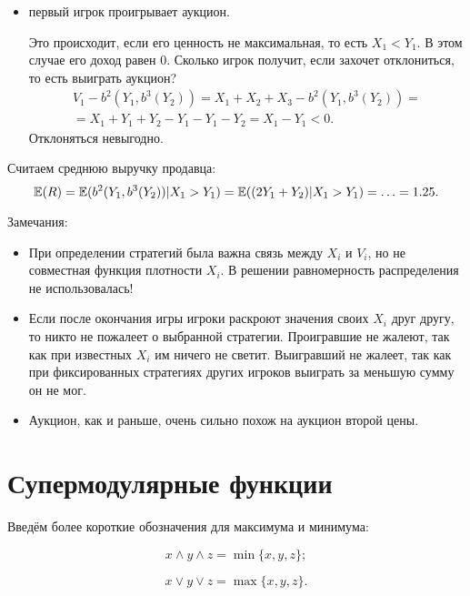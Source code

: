 \begin{myex}
\begin{itemize}
\item первый игрок проигрывает аукцион.

Это происходит, если его ценность не максимальная, то есть $ X_{1}<Y_{1} $. В этом случае его доход равен 0. Сколько игрок получит, если захочет отклониться, то есть выиграть аукцион?
\begin{multline}
 V_{1}-b^{2}(Y_{1},b^{3}(Y_{2}))=X_{1}+X_{2}+X_{3}-b^{2}(Y_{1},b^{3}(Y_{2}))=\\
 =X_{1}+Y_{1}+Y_{2}-Y_{1}-Y_{1}-Y_{2}=X_{1}-Y_{1}<0.
\end{multline}
Отклоняться невыгодно.
\end{itemize}


Считаем среднюю выручку продавца:
\begin{equation}
\operatorname{\mathbb{E}}(R)=\operatorname{\mathbb{E}}(b^{2}(Y_{1},b^{3}(Y_{2}))|X_{1}>Y_{1})=\operatorname{\mathbb{E}}((2Y_{1}+Y_{2})|X_{1}>Y_{1})=\ldots=1.25.
\end{equation}

Замечания:
\begin{itemize}
\item При определении стратегий была важна связь между $ X_{i} $ и $ V_{i} $, но не совместная функция плотности $ X_{i} $. В решении равномерность распределения не использовалась!
\item Если после окончания игры игроки раскроют значения своих $ X_{i} $ друг другу, то никто не пожалеет о выбранной стратегии. Проигравшие не жалеют, так как при известных $ X_{i} $ им ничего не светит. Выигравший не жалеет, так как при фиксированных стратегиях других игроков выиграть за меньшую сумму он не мог.
\item Аукцион, как и раньше, очень сильно похож на аукцион второй цены.
\end{itemize}




\end{myex}



\section{Супермодулярные функции}

Введём более короткие обозначения для максимума и минимума:

\begin{equation}
x\wedge y\wedge z =\min\{x,y,z\};
\end{equation}

\begin{equation}
x\vee y\vee z =\max\{x,y,z\}.
\end{equation}

